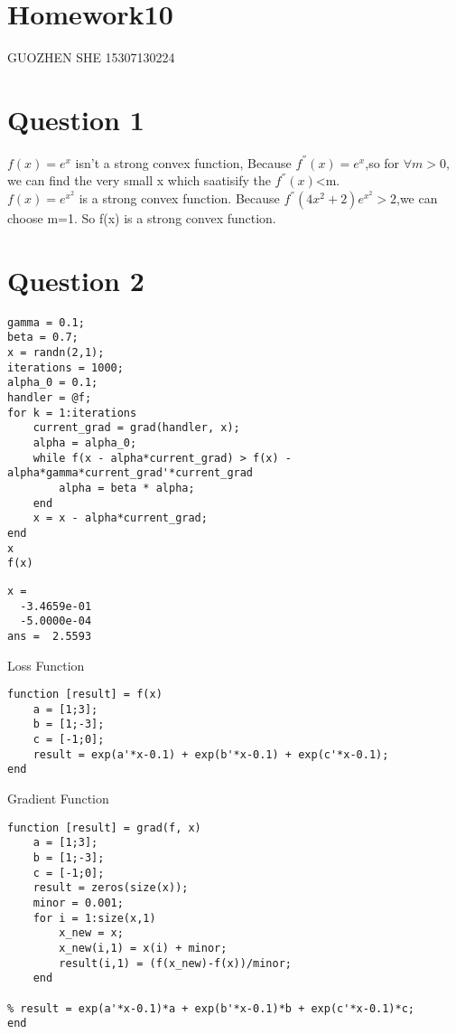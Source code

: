 \documentclass[10pt]{article}
\begin{document}
{\Huge\section*{Homework10}}
GUOZHEN SHE
15307130224
\tableofcontents
\vspace*{4em}

\section{Question 1}
$f(x) = e^x$ isn't a strong convex function, Because $f^{''}(x) = e^x$,so for $\forall m>0$, we can find the very small x which saatisify the $f^{''}(x)$<m.\\
$f(x) = e^{x^2}$ is a strong convex function. Because $f^{''}(4x^2+2)e^{x^2} > 2$,we can choose m=1. So f(x) is a strong convex function.

\section{Question 2}
\begin{lstlisting}
gamma = 0.1;
beta = 0.7;
x = randn(2,1);
iterations = 1000;
alpha_0 = 0.1;
handler = @f;
for k = 1:iterations
    current_grad = grad(handler, x);
    alpha = alpha_0;
    while f(x - alpha*current_grad) > f(x) - alpha*gamma*current_grad'*current_grad
        alpha = beta * alpha;
    end
    x = x - alpha*current_grad;
end
x
f(x)
\end{lstlisting}
\begin{lstlisting}[language={},xleftmargin=5pt,frame=none]
x =
  -3.4659e-01
  -5.0000e-04
ans =  2.5593

\end{lstlisting}
Loss Function
\begin{lstlisting}
function [result] = f(x)
	a = [1;3];
	b = [1;-3];
	c = [-1;0];
	result = exp(a'*x-0.1) + exp(b'*x-0.1) + exp(c'*x-0.1);
end
\end{lstlisting}
Gradient Function
\begin{lstlisting}
function [result] = grad(f, x)
	a = [1;3];
	b = [1;-3];
	c = [-1;0];
	result = zeros(size(x));
	minor = 0.001;
	for i = 1:size(x,1)
		x_new = x;
		x_new(i,1) = x(i) + minor;
		result(i,1) = (f(x_new)-f(x))/minor;
	end

% result = exp(a'*x-0.1)*a + exp(b'*x-0.1)*b + exp(c'*x-0.1)*c;
end
\end{lstlisting}
\end{document}
